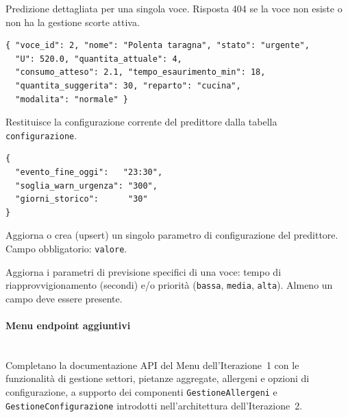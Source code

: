 
Predizione dettagliata per una singola voce. Risposta 404 se la voce non
esiste o non ha la gestione scorte attiva.

\begin{lstlisting}[style=json]
{ "voce_id": 2, "nome": "Polenta taragna", "stato": "urgente",
  "U": 520.0, "quantita_attuale": 4,
  "consumo_atteso": 2.1, "tempo_esaurimento_min": 18,
  "quantita_suggerita": 30, "reparto": "cucina",
  "modalita": "normale" }
\end{lstlisting}


Restituisce la configurazione corrente del predittore dalla tabella
\texttt{configurazione}.

\begin{lstlisting}[style=json]
{
  "evento_fine_oggi":   "23:30",
  "soglia_warn_urgenza": "300",
  "giorni_storico":      "30"
}
\end{lstlisting}


Aggiorna o crea (upsert) un singolo parametro di configurazione del predittore.
Campo obbligatorio: \texttt{valore}.



Aggiorna i parametri di previsione specifici di una voce: tempo di
riapprovvigionamento (secondi) e/o priorità (\texttt{bassa}, \texttt{media},
\texttt{alta}). Almeno un campo deve essere presente.


\paragraph{Menu  endpoint aggiuntivi}\mbox{}\\

Completano la documentazione API del Menu dell'Iterazione~1 con le funzionalità
di gestione settori, pietanze aggregate, allergeni e opzioni di configurazione,
a supporto dei componenti \texttt{GestioneAllergeni} e
\texttt{GestioneConfigurazione} introdotti nell'architettura dell'Iterazione~2.

